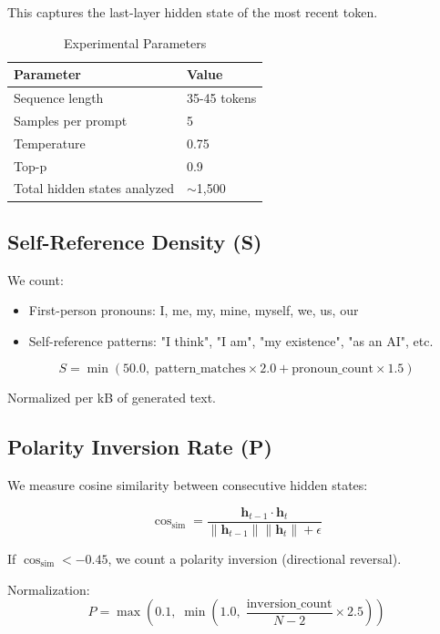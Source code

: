 \documentclass[12pt,a4paper]{article}
\begin{document}
This captures the last-layer hidden state of the most recent token.

\begin{table}[h]
\centering
\caption{Experimental Parameters}
\begin{tabular}{ll}
\toprule
\textbf{Parameter} & \textbf{Value} \\
\midrule
Sequence length & 35-45 tokens \\
Samples per prompt & 5 \\
Temperature & 0.75 \\
Top-p & 0.9 \\
Total hidden states analyzed & $\sim$1,500 \\
\bottomrule
\end{tabular}
\end{table}

\subsection{Self-Reference Density (S)}

We count:
\begin{itemize}[noitemsep]
    \item First-person pronouns: I, me, my, mine, myself, we, us, our
    \item Self-reference patterns: "I think", "I am", "my existence", "as an AI", etc.
\end{itemize}

\begin{equation}
S = \min\left(50.0,\; \text{pattern\_matches} \times 2.0 + \text{pronoun\_count} \times 1.5\right)
\end{equation}

Normalized per kB of generated text.

\subsection{Polarity Inversion Rate (P)}

We measure cosine similarity between consecutive hidden states:

\begin{equation}
\cos_{\text{sim}} = \frac{\mathbf{h}_{t-1} \cdot \mathbf{h}_{t}}{\|\mathbf{h}_{t-1}\| \|\mathbf{h}_{t}\| + \epsilon}
\end{equation}

If $\cos_{\text{sim}} < -0.45$, we count a polarity inversion (directional reversal).

Normalization:
\begin{equation}
P = \max\left(0.1,\; \min\left(1.0,\; \frac{\text{inversion\_count}}{N-2} \times 2.5\right)\right)
\end{equation}
\end{document}
